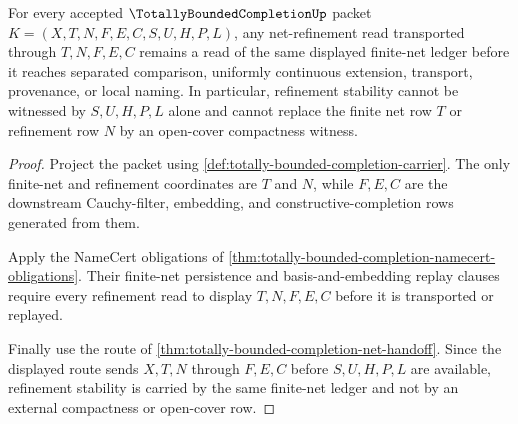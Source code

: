 \begin{theorem}
\label{thm:totally-bounded-completion-net-refinement-stability}
For every accepted $\TotallyBoundedCompletionUp$ packet $K=(X,T,N,F,E,C,S,U,H,P,L)$, any net-refinement read transported through $T,N,F,E,C$ remains a read of the same displayed finite-net ledger before it reaches separated comparison, uniformly continuous extension, transport, provenance, or local naming. In particular, refinement stability cannot be witnessed by $S,U,H,P,L$ alone and cannot replace the finite net row $T$ or refinement row $N$ by an open-cover compactness witness.
\end{theorem}
\begin{proof}
Project the packet using \autoref{def:totally-bounded-completion-carrier}. The only finite-net and refinement coordinates are $T$ and $N$, while $F,E,C$ are the downstream Cauchy-filter, embedding, and constructive-completion rows generated from them.

Apply the NameCert obligations of \autoref{thm:totally-bounded-completion-namecert-obligations}. Their finite-net persistence and basis-and-embedding replay clauses require every refinement read to display $T,N,F,E,C$ before it is transported or replayed.

Finally use the route of \autoref{thm:totally-bounded-completion-net-handoff}. Since the displayed route sends $X,T,N$ through $F,E,C$ before $S,U,H,P,L$ are available, refinement stability is carried by the same finite-net ledger and not by an external compactness or open-cover row.
\end{proof}


